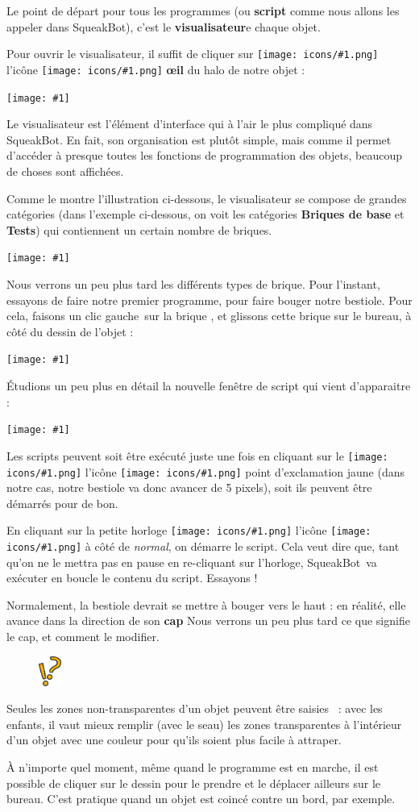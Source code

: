 \documentclass[a4paper,12pt]{book}
\def\appName{SqueakBot}
\def\cg{clic gauche~}
\newcommand{\capture}[1]
{
\begin{center}
	\texttt{[image: \#1]}
\end{center}
}
\newcommand{\brique}[1]{
\sffamily
\fcolorbox[RGB]{200,192,144}{200,248,200}{\textbf{#1}}
\normalfont
}
\newcommand{\important}[1]{\textbf{#1}}
\newcommand{\motcle}[2]{\important{\gls{#1}}}
\newcommand{\inserticon}[1]
{
\texttt{[image: icons/\#1.png]}
}
\newcommand{\icon}[2][]
{
\ifthenelse {\equal{#1} {}} {\inserticon{#2}} {l'icône \inserticon{#2} \important{#1}}
}
\newcommand{\astuce}[1]
{
\begin{framed}
\begin{figure}
	\vspace{-15pt}
	\includegraphics[width=2.0em]{astuce.png}
\end{figure}
#1
\end{framed}
}
\let\myMargin\marginpar
\renewcommand{\marginpar}[1]{\myMargin{{\scriptsize \sffamily #1}}}
\begin{document}
Le point de départ pour tous les programmes (ou \motcle{script}, comme nous allons les appeler dans \appName), c'est le \motcle{visualisateur} de chaque objet.

Pour ouvrir le visualisateur, il suffit de cliquer sur \icon[\og \oe il \fg]{oeil} du halo de notre objet :

\capture{8bis.png}

Le visualisateur est l'élément d'interface qui à l'air le plus compliqué dans \appName. En fait, son organisation est plutôt simple, mais comme il permet d'accéder à presque toutes les fonctions de programmation des objets, beaucoup de choses sont affichées.

Comme le montre l'illustration ci-dessous, le visualisateur se compose de grandes catégories (dans l'exemple ci-dessous, on voit les catégories \important{Briques de base} et \important{Tests}) qui contiennent un certain nombre de briques.

\capture{9.png}

Nous verrons un peu plus tard les différents types de brique. Pour l'instant, essayons de faire notre premier programme, pour faire bouger notre bestiole. Pour cela, faisons un \cg sur la brique \brique{avance de 5}, et glissons cette brique sur le bureau, à côté du dessin de l'objet :

\capture{10bis.png}

Étudions un peu plus en détail la nouvelle fenêtre de script qui vient d'apparaitre :

\capture{11bis.png}

Les scripts peuvent soit être exécuté juste une fois en cliquant sur le \icon{exclamation} point d'exclamation jaune (dans notre cas, notre bestiole va donc avancer de 5 pixels), soit ils peuvent être démarrés pour de bon.

En cliquant sur la petite horloge \icon{horlogestop} à côté de \textit{normal}, on démarre le script. Cela veut dire que, tant qu'on ne le mettra pas en pause en re-cliquant sur l'horloge, \appName~va exécuter en boucle le contenu du script. Essayons !

Normalement, la bestiole devrait se mettre à bouger vers le haut : en réalité, elle avance dans la direction de son \motcle{cap}. Nous verrons un peu plus tard ce que signifie le cap, et comment le modifier.

\astuce{Seules les zones non-transparentes d'un objet peuvent être \og saisies \fg~: avec les enfants, il vaut mieux remplir (avec le seau) les zones transparentes à l'intérieur d'un objet avec une couleur pour qu'ils soient plus facile à attraper.}
À n'importe quel moment, même quand le programme est en marche, il est possible de cliquer sur le dessin pour le prendre et le déplacer ailleurs sur le bureau. C'est pratique quand un objet est coincé contre un bord, par exemple.
\end{document}
